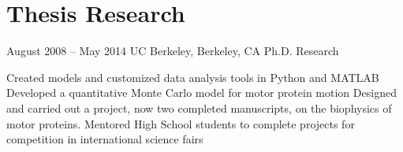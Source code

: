 \documentclass[11pt]{tccv}
\begin{document}
    \section{Thesis Research}

    \begin{eventlist}

    \item{August 2008 -- May 2014}
      {UC Berkeley, Berkeley, CA}
      {Ph.D. Research}
      \begin{itemize}
	\olditem Created models and customized data analysis tools in Python and MATLAB 
	\olditem Developed a quantitative Monte Carlo model for motor protein motion
	\olditem Designed and carried out a project, now two completed manuscripts, on the biophysics of motor proteins.
	\olditem Mentored High School students to complete projects for competition in international science fairs
      \end{itemize}

    \end{eventlist}
\end{document}
